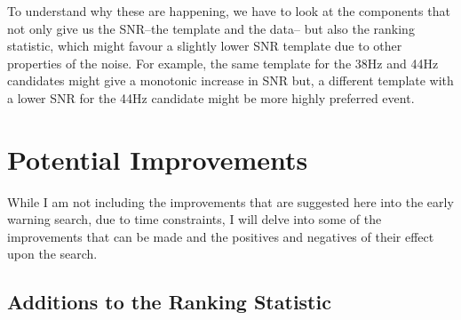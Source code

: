 To understand why these are happening, we have to look at the components that not only give us the SNR--the template and the data-- but also the ranking statistic, which might favour a slightly lower SNR template due to other properties of the noise. For example, the same template for the 38Hz and 44Hz candidates might give a monotonic increase in SNR but, a different template with a lower SNR for the 44Hz candidate might be more highly preferred event.































































\section{\label{6:sec:potential-improvements}Potential Improvements}

While I am not including the improvements that are suggested here into the early warning search, due to time constraints, I will delve into some of the improvements that can be made and the positives and negatives of their effect upon the search.

\subsection{\label{6:subsec:ranking-statistic}Additions to the Ranking Statistic}

